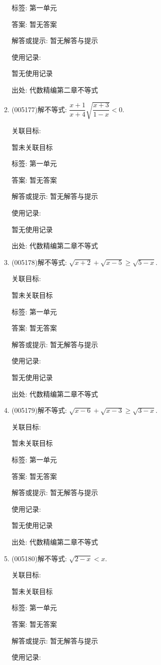 \documentclass[10pt,a4paper]{article}
\begin{document}
\begin{enumerate}[1.]
标签: 第一单元

答案: 暂无答案

解答或提示: 暂无解答与提示

使用记录:

暂无使用记录


出处: 代数精编第二章不等式
\item { (005177)}解不等式: $\dfrac{x+1}{x+4}\sqrt{\dfrac{x+3}{1-x}}<0$.


关联目标:

暂未关联目标



标签: 第一单元

答案: 暂无答案

解答或提示: 暂无解答与提示

使用记录:

暂无使用记录


出处: 代数精编第二章不等式
\item { (005178)}解不等式: $\sqrt{x+2}+\sqrt{x-5}\ge \sqrt{5-x}$.


关联目标:

暂未关联目标



标签: 第一单元

答案: 暂无答案

解答或提示: 暂无解答与提示

使用记录:

暂无使用记录


出处: 代数精编第二章不等式
\item { (005179)}解不等式: $\sqrt{x-6}+\sqrt{x-3}\ge \sqrt{3-x}$.


关联目标:

暂未关联目标



标签: 第一单元

答案: 暂无答案

解答或提示: 暂无解答与提示

使用记录:

暂无使用记录


出处: 代数精编第二章不等式
\item { (005180)}解不等式: $\sqrt{2-x}<x$.


关联目标:

暂未关联目标



标签: 第一单元

答案: 暂无答案

解答或提示: 暂无解答与提示

使用记录:


\end{enumerate}
\end{document}
